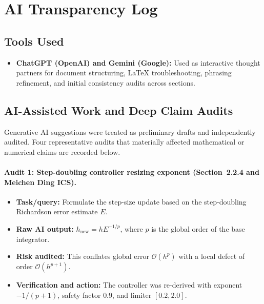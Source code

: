 \section{AI Transparency Log}
\label{app:ai_log}

\subsection*{Tools Used}
\begin{itemize}[leftmargin=1.5em, itemsep=2pt]
    \item \textbf{ChatGPT (OpenAI) and Gemini (Google):} Used as interactive
    thought partners for document structuring, LaTeX troubleshooting, phrasing
    refinement, and initial consistency audits across sections.
\end{itemize}

\subsection*{AI-Assisted Work and Deep Claim Audits}
Generative AI suggestions were treated as preliminary drafts and independently
audited. Four representative audits that materially affected mathematical or
numerical claims are recorded below.

\paragraph{Audit 1: Step-doubling controller resizing exponent
(Section~2.2.4 and Meichen Ding ICS).}
\begin{itemize}[leftmargin=1.5em, itemsep=2pt]
    \item \textbf{Task/query:} Formulate the step-size update based on the
    step-doubling Richardson error estimate $E$.
    \item \textbf{Raw AI output:} $h_{\mathrm{new}}=hE^{-1/p}$, where $p$ is
    the global order of the base integrator.
    \item \textbf{Risk audited:} This conflates global error
    $\mathcal{O}(h^p)$ with a local defect of order $\mathcal{O}(h^{p+1})$.
    \item \textbf{Verification and action:} The controller was re-derived with
    exponent $-1/(p+1)$, safety factor $0.9$, and limiter $[0.2,2.0]$.
\end{itemize}

